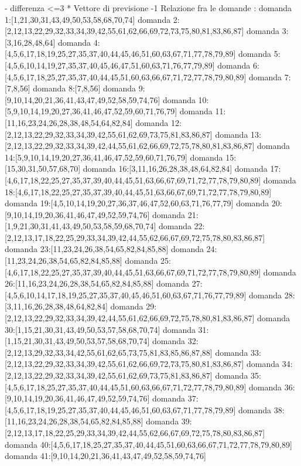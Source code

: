 - differenza <=3
* Vettore di previsione -1
Relazione fra le domande :
domanda 1:[1,21,30,31,43,49,50,53,58,68,70,74]
domanda 2:[2,12,13,22,29,32,33,34,39,42,55,61,62,66,69,72,73,75,80,81,83,86,87]
domanda 3:[3,16,28,48,64]
domanda 4:[4,5,6,17,18,19,25,27,35,37,40,44,45,46,51,60,63,67,71,77,78,79,89]
domanda 5:[4,5,6,10,14,19,27,35,37,40,45,46,47,51,60,63,71,76,77,79,89]
domanda 6:[4,5,6,17,18,25,27,35,37,40,44,45,51,60,63,66,67,71,72,77,78,79,80,89]
domanda 7:[7,8,56]
domanda 8:[7,8,56]
domanda 9:[9,10,14,20,21,36,41,43,47,49,52,58,59,74,76]
domanda 10:[5,9,10,14,19,20,27,36,41,46,47,52,59,60,71,76,79]
domanda 11:[11,16,23,24,26,28,38,48,54,64,82,84]
domanda 12:[2,12,13,22,29,32,33,34,39,42,55,61,62,69,73,75,81,83,86,87]
domanda 13:[2,12,13,22,29,32,33,34,39,42,44,55,61,62,66,69,72,75,78,80,81,83,86,87]
domanda 14:[5,9,10,14,19,20,27,36,41,46,47,52,59,60,71,76,79]
domanda 15:[15,30,31,50,57,68,70]
domanda 16:[3,11,16,26,28,38,48,64,82,84]
domanda 17:[4,6,17,18,22,25,27,35,37,39,40,44,45,51,63,66,67,69,71,72,77,78,79,80,89]
domanda 18:[4,6,17,18,22,25,27,35,37,39,40,44,45,51,63,66,67,69,71,72,77,78,79,80,89]
domanda 19:[4,5,10,14,19,20,27,36,37,46,47,52,60,63,71,76,77,79]
domanda 20:[9,10,14,19,20,36,41,46,47,49,52,59,74,76]
domanda 21:[1,9,21,30,31,41,43,49,50,53,58,59,68,70,74]
domanda 22:[2,12,13,17,18,22,25,29,33,34,39,42,44,55,62,66,67,69,72,75,78,80,83,86,87]
domanda 23:[11,23,24,26,38,54,65,82,84,85,88]
domanda 24:[11,23,24,26,38,54,65,82,84,85,88]
domanda 25:[4,6,17,18,22,25,27,35,37,39,40,44,45,51,63,66,67,69,71,72,77,78,79,80,89]
domanda 26:[11,16,23,24,26,28,38,54,65,82,84,85,88]
domanda 27:[4,5,6,10,14,17,18,19,25,27,35,37,40,45,46,51,60,63,67,71,76,77,79,89]
domanda 28:[3,11,16,26,28,38,48,64,82,84]
domanda 29:[2,12,13,22,29,32,33,34,39,42,44,55,61,62,66,69,72,75,78,80,81,83,86,87]
domanda 30:[1,15,21,30,31,43,49,50,53,57,58,68,70,74]
domanda 31:[1,15,21,30,31,43,49,50,53,57,58,68,70,74]
domanda 32:[2,12,13,29,32,33,34,42,55,61,62,65,73,75,81,83,85,86,87,88]
domanda 33:[2,12,13,22,29,32,33,34,39,42,55,61,62,66,69,72,73,75,80,81,83,86,87]
domanda 34:[2,12,13,22,29,32,33,34,39,42,55,61,62,69,73,75,81,83,86,87]
domanda 35:[4,5,6,17,18,25,27,35,37,40,44,45,51,60,63,66,67,71,72,77,78,79,80,89]
domanda 36:[9,10,14,19,20,36,41,46,47,49,52,59,74,76]
domanda 37:[4,5,6,17,18,19,25,27,35,37,40,44,45,46,51,60,63,67,71,77,78,79,89]
domanda 38:[11,16,23,24,26,28,38,54,65,82,84,85,88]
domanda 39:[2,12,13,17,18,22,25,29,33,34,39,42,44,55,62,66,67,69,72,75,78,80,83,86,87]
domanda 40:[4,5,6,17,18,25,27,35,37,40,44,45,51,60,63,66,67,71,72,77,78,79,80,89]
domanda 41:[9,10,14,20,21,36,41,43,47,49,52,58,59,74,76]

